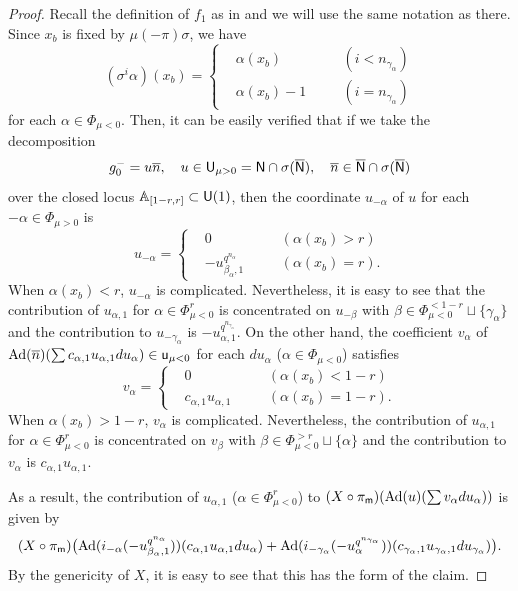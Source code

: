 \documentclass[12pt,reqno]{amsart}
\begin{document}
\begin{proof}
    Recall the definition of $f_1$ as in  and we will use the same notation as there. Since $x_b$ is fixed by $\mu(-\pi)\sigma$, we have 
    \[
        (\sigma^i \alpha)(x_b) = \left\{ \begin{alignedat}{4}
            & \alpha(x_b) & \quad & (i < n_{\gamma_\alpha}) \\
            & \alpha(x_b) - 1 & \quad & (i = n_{\gamma_\alpha})
        \end{alignedat}
        \right.
    \]
    for each $\alpha \in \Phi_{\mu < 0}$. Then, it can be easily verified that if we take the decomposition 
    \[
        g_0^- = u {\overline{n}}, \quad u \in {\mathsf{U}}_{\mu > 0} = {\mathsf{N}} \cap \sigma({\overline{{\mathsf{N}}}}) ,\quad {\overline{n}} \in {\mathsf{{\overline{N}}}} \cap \sigma({\mathsf{{\overline{N}}}})
    \]
    over the closed locus $\mathbb{A}_{[1-r, r]} \subset {\mathsf{U}}(1)$, then the coordinate $u_{-\alpha}$ of $u$ for each $- \alpha \in \Phi_{\mu > 0}$ is 
    \[
        u_{-\alpha} = \left\{ \begin{alignedat}{4}
            & 0 & \quad & (\alpha(x_b) > r) \\
            & - u_{\beta_{\alpha}, 1}^{q^{n_{\alpha}}} & \quad & (\alpha(x_b) = r). 
        \end{alignedat}
        \right.
    \]  
    When $\alpha(x_b) < r$, $u_{-\alpha}$ is complicated. %
    Nevertheless, it is easy to see that the contribution of $u_{\alpha, 1}$ for $\alpha \in \Phi_{\mu < 0}^r$ is concentrated on $u_{-\beta}$ with $\beta \in \Phi_{\mu < 0}^{< 1 - r} \sqcup \{ \gamma_\alpha \}$ and the contribution to $u_{-\gamma_\alpha}$ is $- u_{\alpha, 1}^{q^{n_{\gamma_\alpha}}}$. On the other hand, the coefficient $v_\alpha$ of ${\operatorname{Ad}}({\overline{n}})(\sum c_{\alpha, 1} u_{\alpha, 1} du_\alpha) \in {\mathsf{u}}_{\mu < 0}$ for each $du_\alpha$ ($\alpha \in \Phi_{\mu < 0}$) satisfies 
    \[
        v_\alpha = \left\{ \begin{alignedat}{4}
            & 0 & \quad & (\alpha(x_b) < 1 - r) \\
            & c_{\alpha, 1}u_{\alpha, 1} & \quad & (\alpha(x_b) = 1 - r). 
        \end{alignedat}
        \right.
    \]  
    When $\alpha(x_b) > 1 - r$, $v_\alpha$ is complicated. Nevertheless, the contribution of $u_{\alpha, 1}$ for $\alpha \in \Phi_{\mu < 0}^r$ is concentrated on $v_{\beta}$ with $\beta \in \Phi_{\mu < 0}^{> r} \sqcup \{ \alpha \}$ and the contribution to $v_{\alpha}$ is $c_{\alpha, 1}u_{\alpha, 1}$.

    As a result, the contribution of $u_{\alpha, 1}$ ($\alpha \in \Phi^r_{\mu < 0}$) to $(X \circ \pi_{{\mathsf{m}}})({\operatorname{Ad}}(u)(\sum v_\alpha du_\alpha))$ is given by 
    \[
        (X\circ \pi_{{\mathsf{m}}})\bigl({\operatorname{Ad}}(i_{-\alpha}(- u_{\beta_{\alpha}, 1}^{q^{n_{\alpha}}}))(c_{\alpha, 1} u_{\alpha, 1} du_\alpha) + {\operatorname{Ad}}(i_{- \gamma_\alpha}(- u_\alpha^{q^{n_{\gamma_\alpha}}}))(c_{\gamma_\alpha, 1} u_{\gamma_\alpha, 1} du_{\gamma_\alpha})\bigr). 
    \]
    By the genericity of $X$, it is easy to see that this has the form of the claim. 
\end{proof}
\end{document}
